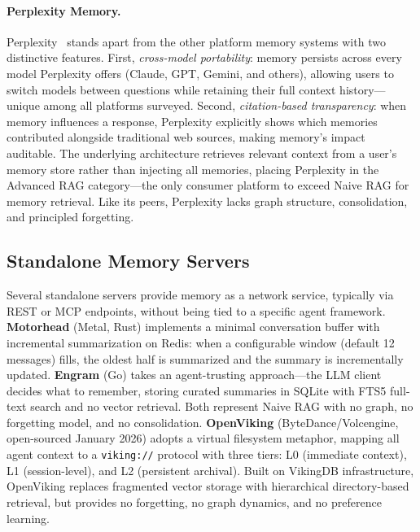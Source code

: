 \paragraph{Perplexity Memory.}
Perplexity~\cite{perplexity2025memory} stands apart from the other
platform memory systems with two distinctive features.  First,
\emph{cross-model portability}: memory persists across every model
Perplexity offers (Claude, GPT, Gemini, and others), allowing users
to switch models between questions while retaining their full context
history---unique among all platforms surveyed.  Second,
\emph{citation-based transparency}: when memory influences a response,
Perplexity explicitly shows which memories contributed alongside
traditional web sources, making memory's impact auditable.  The
underlying architecture retrieves relevant context from a user's memory
store rather than injecting all memories, placing Perplexity in the
Advanced RAG category---the only consumer platform to exceed Naive RAG
for memory retrieval.  Like its peers, Perplexity lacks graph structure,
consolidation, and principled forgetting.

\subsection{Standalone Memory Servers}
\label{sec:standalone}

Several standalone servers provide memory as a network service,
typically via REST or MCP endpoints, without being tied to a specific
agent framework. \textbf{Motorhead} (Metal, Rust) implements a
minimal conversation buffer with incremental summarization on Redis:
when a configurable window (default 12 messages) fills, the oldest
half is summarized and the summary is incrementally updated.
\textbf{Engram} (Go) takes an agent-trusting approach---the LLM
client decides what to remember, storing curated summaries in SQLite
with FTS5 full-text search and no vector retrieval. Both represent
Naive RAG with no graph, no forgetting model, and no consolidation.
\textbf{OpenViking} (ByteDance/Volcengine, open-sourced January 2026)
adopts a virtual filesystem metaphor, mapping all agent context to a
\texttt{viking://} protocol with three tiers: L0 (immediate context),
L1 (session-level), and L2 (persistent archival). Built on VikingDB
infrastructure, OpenViking replaces fragmented vector storage with
hierarchical directory-based retrieval, but provides no forgetting,
no graph dynamics, and no preference learning.

